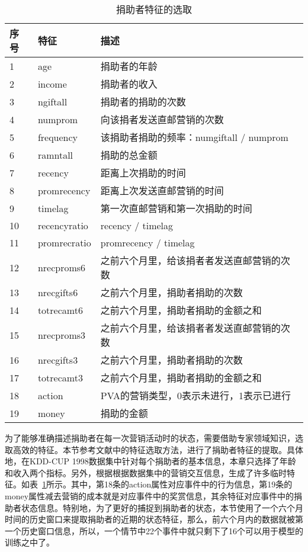 \begin{table}[htbp]
  \centering
  \caption{捐助者特征的选取}
  \label{tab:obser_donors}
  \begin{tabular}{lll}
    \toprule
      序号 & 特征 & 描述 \\
    \midrule
      1 & age & 捐助者的年龄 \\
      2 &income & 捐助者的收入 \\
      3 &ngiftall & 捐助者的捐助的次数 \\
      4 &numprom & 向该捐者发送直邮营销的次数 \\
      5 &frequency & 该捐助者捐助的频率：numgiftall / numprom \\
      6 &ramntall & 捐助的总金额 \\
      7 &recency & 距离上次捐助的时间 \\
      8 &promrecency & 距离上次发送直邮营销的时间\\
      9 &timelag & 第一次直邮营销和第一次捐助的时间\\
      10 &recencyratio & recency / timelag\\
	  11 &promrecratio & promrecency / timelag\\
      12 &nrecproms6 & 之前六个月里，给该捐者者发送直邮营销的次数\\
      13 &nrecgifts6 & 之前六个月里，捐助者捐助的次数\\
      14 &totrecamt6 & 之前六个月里，捐助者捐助的金额之和\\ 
      15 &nrecproms3 & 之前六个月里，给该捐者者发送直邮营销的次数\\
      16 &nrecgifts3 & 之前六个月里，捐助者捐助的次数\\
      17 &totrecamt3 & 之前六个月里，捐助者捐助的金额之和\\            	  
	  18 &action & PVA的营销类型，0表示未进行，1表示已进行\\
	  19 &money &  捐助的金额\\
    \bottomrule
  \end{tabular}
\end{table}

为了能够准确描述捐助者在每一次营销活动时的状态，需要借助专家领域知识，选取高效的特征。本节参考文献\citep{pednault2002sequential}中的特征选取方法，进行了捐助者特征的提取。具体地，在KDD-CUP 1998数据集中针对每个捐助者的基本信息，本章只选择了年龄和收入两个指标。另外，根据根据数据集中的营销交互信息，生成了许多临时特征。如表~\ref{tab:obser_donors}所示。其中，第18条的action属性对应事件中的行为信息，第19条的money属性减去营销的成本就是对应事件中的奖赏信息，其余特征对应事件中的捐助者状态信息。特别地，为了更好的捕捉到捐助者的状态，本节使用了一个六个月时间的历史窗口来提取捐助者的近期的状态特征，那么，前六个月内的数据就被第一个历史窗口信息，所以，一个情节中22个事件中就只剩下了16个可以用于模型的训练之中了。


